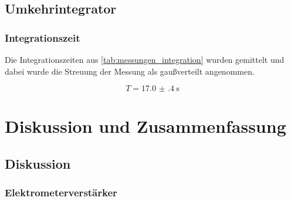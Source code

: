 \documentclass[12pt,english,ngerman]{scrartcl}
\begin{document}
\subsection{Umkehrintegrator}

\subsubsection{Integrationszeit}
Die Integrationszeiten aus \autoref{tab:messungen_integration} wurden gemittelt
und dabei wurde die Streuung der Messung als gaußverteilt angenommen.

\begin{equation}
  T = \SI{17.0(4)}{\second}
  \label{eq:wert_integrationszeit}
\end{equation}

\section{Diskussion und Zusammenfassung}\label{sec:Diskussion} 
\subsection{Diskussion}

\subsubsection{Elektrometerverstärker}
\end{document}
